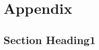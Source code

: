 \chapter*{Appendix}

\renewcommand{\thesection}{A\arabic{section}}
\renewcommand{\thefigure}{A\arabic{section}.\arabic{figure}}
\renewcommand{\thetable}{A\arabic{section}.\arabic{table}}

\section{Section Heading1}